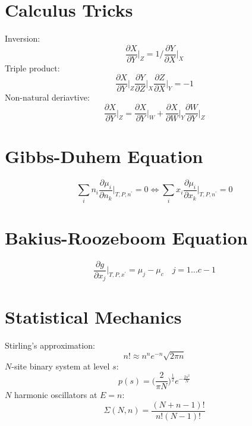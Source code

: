 \documentclass[a4paper,11pt]{article}
\begin{document}
\begin{multicols}{2}
\section{Calculus Tricks}
Inversion:
\begin{equation}
	\frac{\partial X}{\partial Y}\bigg|_Z = 1 / \frac{\partial Y}{\partial X}\bigg|_X
\end{equation}
Triple product:
\begin{equation}
	\frac{\partial X}{\partial Y}\bigg|_Z \frac{\partial Y}{\partial Z}\bigg|_X \frac{\partial Z}{\partial X}\bigg|_Y = -1
\end{equation}
Non-natural deriavtive:
\begin{equation}
	\frac{\partial X}{\partial Y}\bigg|_Z = \frac{\partial X}{\partial Y}\bigg|_W + \frac{\partial X}{\partial W}\bigg|_Y\frac{\partial W}{\partial Y}\bigg|_Z
\end{equation}

\section{Gibbs-Duhem Equation}
\begin{equation}\label{eq:gd-eq}
	\sum_i n_i\frac{\partial \mu_i}{\partial n_k}\bigg|_{T, P, n^\prime} = 0 \iff \sum_i x_i\frac{\partial \mu_i}{\partial x_k}\bigg|_{T, P, n^\prime} = 0 
\end{equation}

\section{Bakius-Roozeboom Equation}
\begin{equation}\label{eq:br-eq}
	\frac{\partial g}{\partial x_j}\bigg|_{T, P, x^\prime} = \mu_j - \mu_c\quad j=1\dots c-1
\end{equation}

\section{Statistical Mechanics}
Stirling's approximation:
\begin{equation}
	n! \approx n^n e^{-n} \sqrt{2\pi n}
\end{equation}
$N$-site binary system at level $s$:
\begin{equation}
	p(s) = \bigg(\frac{2}{\pi N}\bigg)^{\tfrac{1}{2}}e^{-\frac{2s^2}{N}}
\end{equation}
$N$ harmonic oscillators at $E=n$:\\
\begin{equation}
	\Sigma (N, n) = \frac{(N+n-1)!}{n!(N-1)!}
\end{equation}

\end{multicols}

\end{document}
